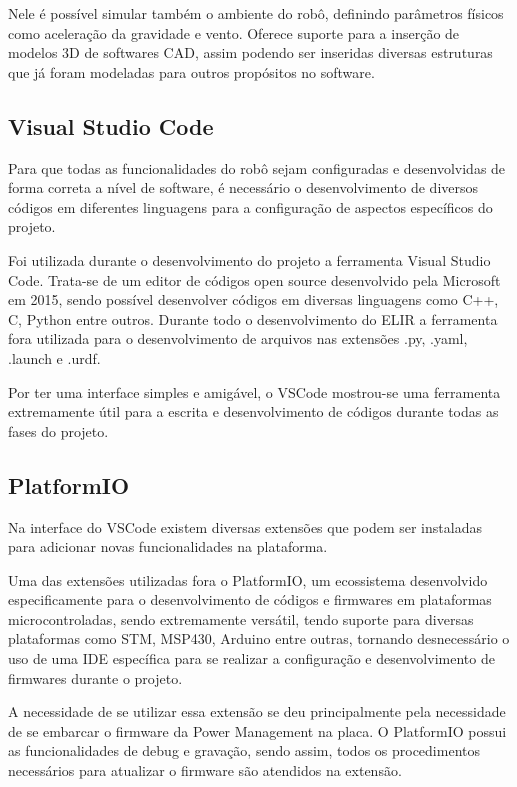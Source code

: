 Nele é possível simular também o ambiente do robô, definindo parâmetros físicos como aceleração da gravidade e vento. Oferece suporte para a inserção de modelos 3D de softwares CAD, assim podendo ser inseridas diversas estruturas que já foram modeladas para outros propósitos no software.

\subsection{Visual Studio Code}
Para que todas as funcionalidades do robô sejam configuradas e desenvolvidas de forma correta a nível de software, é necessário o desenvolvimento de diversos códigos em diferentes linguagens para a configuração de aspectos específicos do projeto.

Foi utilizada durante o desenvolvimento do projeto a ferramenta Visual Studio Code. Trata-se de um editor de códigos open source desenvolvido pela Microsoft em 2015, sendo possível desenvolver códigos em diversas linguagens como C++, C, Python entre outros. Durante todo o desenvolvimento do ELIR a ferramenta fora utilizada para o desenvolvimento de arquivos nas extensões .py, .yaml, .launch e .urdf.  

Por ter uma interface simples e amigável, o VSCode mostrou-se uma ferramenta extremamente útil para a escrita e desenvolvimento de códigos durante todas as fases do projeto. 

\subsection{PlatformIO}
Na interface do VSCode existem diversas extensões que podem ser instaladas para adicionar novas funcionalidades na plataforma.

Uma das extensões utilizadas fora o PlatformIO, um ecossistema desenvolvido especificamente para o desenvolvimento de códigos e firmwares em plataformas microcontroladas, sendo extremamente versátil, tendo suporte para diversas plataformas como STM, MSP430, Arduino entre outras, tornando desnecessário o uso de uma IDE específica para se realizar a configuração e desenvolvimento de firmwares durante o projeto.

A necessidade de se utilizar essa extensão se deu principalmente pela necessidade de se embarcar o firmware da Power Management na placa. O PlatformIO possui as funcionalidades de debug e gravação, sendo assim, todos os procedimentos necessários para atualizar o firmware são atendidos na extensão.


